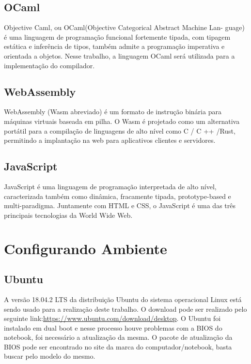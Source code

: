 \documentclass[12pt,a4paper,twoside]{article}
\begin{document}
\subsection{OCaml}
Objective Caml, ou OCaml(Objective Categorical Abstract Machine Lan-
guage) é uma linguagem de programação funcional fortemente tipada, com tipagem estática e inferência de tipos, também admite a programação imperativa e orientada a objetos. Nesse trabalho, a linguagem OCaml será utilizada para a implementação do compilador.
\subsection{WebAssembly}
WebAssembly (Wasm abreviado) é um formato de instrução binária para
máquinas virtuais baseada em pilha. O Wasm é projetado como um alternativa portátil para a compilação de linguagens de alto nível como C / C ++ /Rust, permitindo a implantação na web para aplicativos clientes e servidores.
\subsection{JavaScript}
JavaScript é uma linguagem de programação interpretada de alto nível, caracterizada também como dinâmica, fracamente tipada, prototype-based e multi-paradigma. Juntamente com HTML e CSS, o JavaScript é uma das três principais tecnologias da World Wide Web.
\newpage

\section{Configurando Ambiente}
\subsection{Ubuntu}
A versão 18.04.2 LTS da distribuição Ubuntu do sistema operacional Linux está sendo usado para a realização deste trabalho. O download pode ser realizado pelo seguinte link:\newline \href{https://www.ubuntu.com/download/desktop}{https://www.ubuntu.com/download/desktop}.\newline
O Ubuntu foi instalado em dual boot e nesse processo houve problemas com a BIOS do notebook, foi necessário a atualização da mesma. O pacote de atualização da BIOS pode ser encontrado no site da marca do computador/notebook, basta buscar pelo modelo do mesmo.
\end{document}
